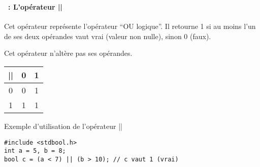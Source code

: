 \begin{frame}[containsverbatim]
  \frametitle{\secname}
  \framesubtitle{\subsecname~: L'opérateur ||} 

  Cet opérateur représente l'opérateur ``OU logique''. Il retourne 1 si au moins l'un de ses deux opérandes vaut vrai (valeur non nulle), 
  sinon 0 (faux).
  \par
  Cet opérateur n'altère pas ses opérandes.
  \vspace{0.5cm}
    \begin{center}
    \begin{tabular}{|c|c|c|}
      \hline
      || & 0 & 1 \\
      \hline
      0  & 0 & 1 \\
      \hline
      1  & 1 & 1 \\
      \hline
    \end{tabular}
  \end{center}
  \begin{exampleblock}{Exemple d'utilisation de l'opérateur ||}
    \begin{verbatim}
#include <stdbool.h>
int a = 5, b = 8;
bool c = (a < 7) || (b > 10); // c vaut 1 (vrai)
    \end{verbatim}
  \end{exampleblock}
\end{frame}

